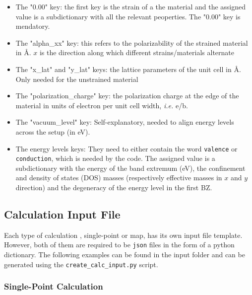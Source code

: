 \documentclass[a4paper,12pt]{article}
\newcommand{\angstrom}{\textup{\AA}}
\begin{document}
\begin{itemize}
\item The "0.00" key: the first key is the strain of a the material and the assigned value is a subdictionary with all the relevant peoperties. The "0.00" key is mendatory.

\item The "alpha\_xx" key: this refers to the polarizability of the strained material in \angstrom. $x$ is the direction along which different strains/materials alternate

\item The "x\_lat" and "y\_lat" keys: the lattice parameters of the unit cell in \angstrom. Only needed for the unstrained material

\item The "polarization\_charge" key: the polarization charge at the edge of the material in units of electron per unit cell width, \textit{i.e.} e/b.

\item The "vacuum\_level" key: Self-explanatory, needed to align energy levels across the setup (in eV).

\item The energy levels keys: They need to either contain the word \texttt{valence} or \texttt{conduction}, which is needed by the code. The assigned value is a subdictionary with the energy of the band extremum (eV), the confinement and density of states (DOS) masses (respectively effective masses in $x$ and $y$ direction) and the degeneracy of the energy level in the first BZ.

\end{itemize}

\subsection{Calculation Input File}
Each type of calculation , single-point or map, has its own input file template. However, both of them are required to be \texttt{json} files in the form of a python dictionary. The following examples can be found in the input folder and can be generated using the \texttt{create\_calc\_input.py} script.

\subsubsection{Single-Point Calculation}
\end{document}
